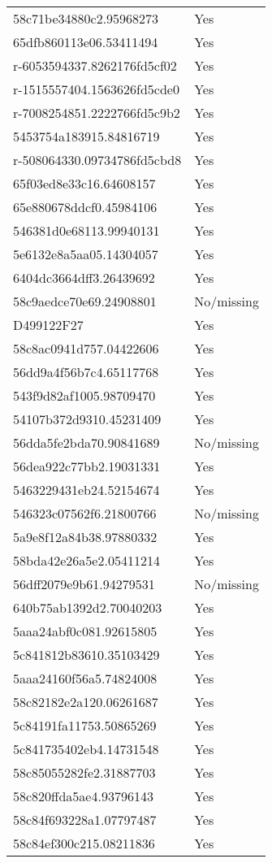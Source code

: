 \begin{tabular}{ll}
58c71be34880c2.95968273 & Yes \\
65dfb860113e06.53411494 & Yes \\
r-6053594337.8262176fd5cf02 & Yes \\
r-1515557404.1563626fd5cde0 & Yes \\
r-7008254851.2222766fd5c9b2 & Yes \\
5453754a183915.84816719 & Yes \\
r-508064330.09734786fd5cbd8 & Yes \\
65f03ed8e33c16.64608157 & Yes \\
65e880678ddcf0.45984106 & Yes \\
546381d0e68113.99940131 & Yes \\
5e6132e8a5aa05.14304057 & Yes \\
6404dc3664dff3.26439692 & Yes \\
58c9aedce70e69.24908801 & No/missing \\
D499122F27 & Yes \\
58c8ac0941d757.04422606 & Yes \\
56dd9a4f56b7c4.65117768 & Yes \\
543f9d82af1005.98709470 & Yes \\
54107b372d9310.45231409 & Yes \\
56dda5fe2bda70.90841689 & No/missing \\
56dea922c77bb2.19031331 & Yes \\
5463229431eb24.52154674 & Yes \\
546323c07562f6.21800766 & No/missing \\
5a9e8f12a84b38.97880332 & Yes \\
58bda42e26a5e2.05411214 & Yes \\
56dff2079e9b61.94279531 & No/missing \\
640b75ab1392d2.70040203 & Yes \\
5aaa24abf0c081.92615805 & Yes \\
5c841812b83610.35103429 & Yes \\
5aaa24160f56a5.74824008 & Yes \\
58c82182e2a120.06261687 & Yes \\
5c84191fa11753.50865269 & Yes \\
5c841735402eb4.14731548 & Yes \\
58c85055282fe2.31887703 & Yes \\
58c820ffda5ae4.93796143 & Yes \\
58c84f693228a1.07797487 & Yes \\
58c84ef300c215.08211836 & Yes \\

\end{tabular}
